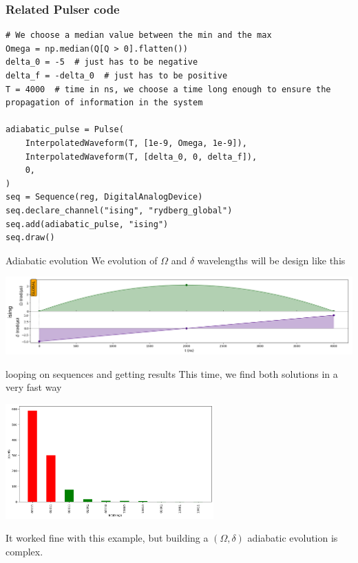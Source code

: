 \begin{frame}[fragile]
\frametitle{Related Pulser code}
\begin{verbatim}
# We choose a median value between the min and the max
Omega = np.median(Q[Q > 0].flatten())
delta_0 = -5  # just has to be negative
delta_f = -delta_0  # just has to be positive
T = 4000  # time in ns, we choose a time long enough to ensure the propagation of information in the system

adiabatic_pulse = Pulse(
    InterpolatedWaveform(T, [1e-9, Omega, 1e-9]),
    InterpolatedWaveform(T, [delta_0, 0, delta_f]),
    0,
)
seq = Sequence(reg, DigitalAnalogDevice)
seq.declare_channel("ising", "rydberg_global")
seq.add(adiabatic_pulse, "ising")
seq.draw()
\end{verbatim}
\end{frame}
\begin{frame}{Adiabatic evolution}
We evolution of $\Omega$ and $\delta$ wavelengths will be design like this
\begin{center}
\includegraphics[width=14cm]{images/tutorials_qubo_46_0.png}    
\end{center}
\end{frame}

\begin{frame}{looping on sequences and getting results}
This time, we find both solutions in a very fast way 
\begin{center}
\includegraphics[width=8cm]{images/tutorials_qubo_48_0.png}    
\end{center}
It worked fine with this example, but building a $(\Omega, \delta)$ adiabatic evolution is complex.
 
\end{frame}